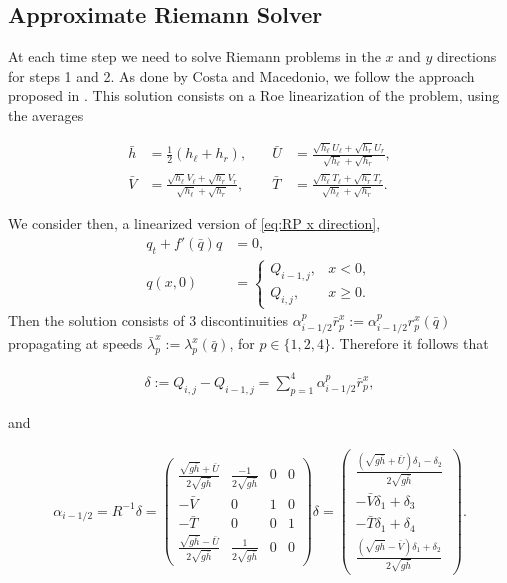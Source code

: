 \documentclass[12pt]{article}
\newcommand{\sgh}{\sqrt{g\bar{h}}} %
\begin{document}
\subsection{Approximate Riemann Solver}

At each time step we need to solve Riemann problems in the $x$ and $y$ directions for steps 1 and 2. 
As done by Costa and Macedonio, we follow the approach proposed in \cite{monthe1999positivity}. 
This solution consists on a Roe linearization of the problem, using the averages

\begin{align}
    \label{eq: Roe averages}
    \bar{h}&=\frac12(h_\ell+h_r), \quad & 
    \bar{U}&=\frac{\sqrt{h_\ell}U_\ell+\sqrt{h_r}U_r}{\sqrt{h_\ell}+\sqrt{h_r}},\\
    \bar{V}&=\frac{\sqrt{h_\ell}V_\ell+\sqrt{h_r}V_r}{\sqrt{h_\ell}+\sqrt{h_r}}, \quad &
    \bar{T}&=\frac{\sqrt{h_\ell}T_\ell+\sqrt{h_r}T_r}{\sqrt{h_\ell}+\sqrt{h_r}}.
\end{align}

We consider then, a linearized version of \eqref{eq:RP x direction},
\begin{align}
            \label{eq:RP x direction Roe}
            q_t+f'(\bar{q})q&=0,\\
            q(x,0)&=\begin{cases}
                Q_{i-1,j}, &x<0,\\
                Q_{i,j}, &x\geq 0.
            \end{cases}
\end{align}
Then the solution consists of 3 discontinuities $\alpha^p_{i-1/2}\bar{r}^x_p:=\alpha^p_{i-1/2}r^x_p(\bar{q})$ propagating at speeds $\bar{\lambda}^x_p:=\lambda^x_p(\bar{q})$, for $p\in\{1,2,4\}$. 
Therefore it follows that

\begin{align}
   \delta:= Q_{i,j}-Q_{i-1,j}=\sum_{p=1}^4 \alpha^p_{i-1/2}\bar{r}^x_p,
\end{align}

and

\begin{align}
    \alpha_{i-1/2}=
    R^{-1}\delta=
    \begin{pmatrix}
        \frac{\sgh+\bar{U}}{2\sgh} & \frac{-1}{2\sgh} & 0 & 0 \\
        -\bar{V} & 0 & 1 & 0\\
        -\bar{T} & 0 & 0 & 1\\
        \frac{\sgh-\bar{U}}{2\sgh} & \frac{1}{2\sgh} & 0 & 0
    \end{pmatrix}
    \delta=
    \begin{pmatrix}
        \frac{ (\sgh+\bar{U})\delta_1-\delta_2}{2\sgh}\\
        -\bar{V}\delta_1+\delta_3\\
        -\bar{T}\delta_1+\delta_4\\
        \frac{ (\sgh-\bar{V})\delta_1+\delta_2}{2\sgh}\
    \end{pmatrix}.
\end{align}
\end{document}
